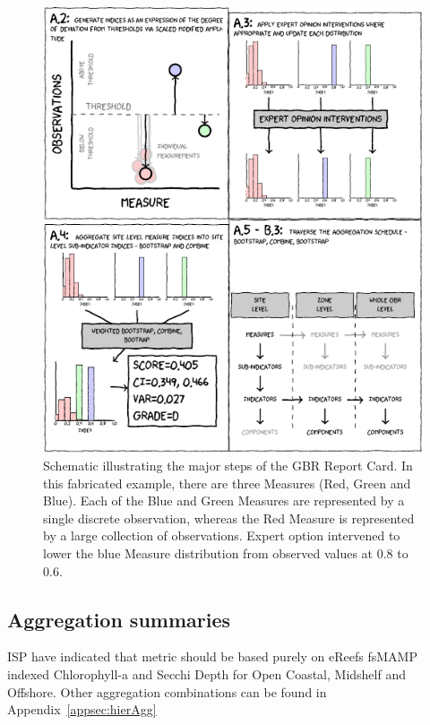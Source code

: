 \begin{figure}[h]
\includegraphics[width=\linewidth]{figures/Diagrams/schematic.pdf}
\caption{Schematic illustrating the major steps of the GBR Report Card. In this fabricated example,
there are three Measures (Red, Green and Blue).  Each of the Blue and Green Measures are represented by a single
discrete observation, whereas the Red Measure is represented by a large collection of observations.
Expert option intervened to lower the blue Measure distribution from observed values at 0.8 to 0.6.}\label{fig:schematic}
\end{figure}

\clearpage




\subsection{Aggregation summaries}

ISP have indicated that metric should be based purely on eReefs fsMAMP indexed Chlorophyll-a and Secchi Depth for Open Coastal, Midshelf and Offshore.
Other aggregation combinations can be found in Appendix~\ref{appsec:hierAgg}
